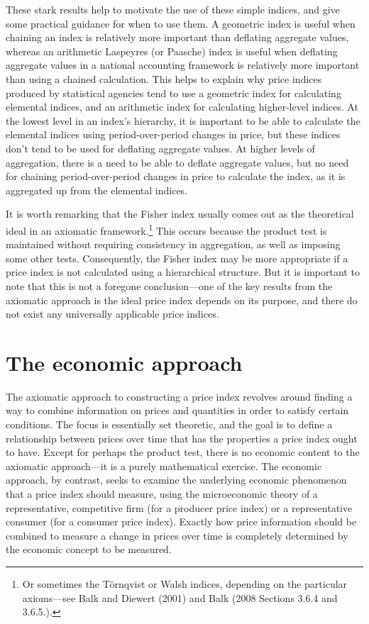 \documentclass[]{article}
\begin{document}
These stark results help to motivate the use of these simple indices, and give some practical guidance for when to use them. A geometric index is useful when chaining an index is relatively more important than deflating aggregate values, whereas an arithmetic Laspeyres (or Paasche) index is useful when deflating aggregate values in a national accounting framework is relatively more important than using a chained calculation. This helps to explain why price indices produced by statistical agencies tend to use a geometric index for calculating elemental indices, and an arithmetic index for calculating higher-level indices. At the lowest level in an index's hierarchy, it is important to be able to calculate the elemental indices using period-over-period changes in price, but these indices don't tend to be used for deflating aggregate values. At higher levels of aggregation, there is a need to be able to deflate aggregate values, but no need for chaining period-over-period changes in price to calculate the index, as it is aggregated up from the elemental indices.

It is worth remarking that the Fisher index usually comes out as the theoretical ideal in an axiomatic framework.\footnote{Or sometimes the Törnqvist or Walsh indices, depending on the particular axioms---see Balk and Diewert (2001) and Balk (2008 Sections 3.6.4 and 3.6.5.).} This occurs because the product test is maintained without requiring consistency in aggregation, as well as imposing some other tests. Consequently, the Fisher index may be more appropriate if a price index is not calculated using a hierarchical structure. But it is important to note that this is not a foregone conclusion---one of the key results from the axiomatic approach is the ideal price index depends on its purpose, and there do not exist any universally applicable price indices.

\hypertarget{the-economic-approach}{%
\section{The economic approach}\label{the-economic-approach}}

The axiomatic approach to constructing a price index revolves around finding a way to combine information on prices and quantities in order to satisfy certain conditions. The focus is essentially set theoretic, and the goal is to define a relationship between prices over time that has the properties a price index ought to have. Except for perhaps the product test, there is no economic content to the axiomatic approach---it is a purely mathematical exercise. The economic approach, by contrast, seeks to examine the underlying economic phenomenon that a price index should measure, using the microeconomic theory of a representative, competitive firm (for a producer price index) or a representative consumer (for a consumer price index). Exactly how price information should be combined to measure a change in prices over time is completely determined by the economic concept to be measured.
\end{document}
